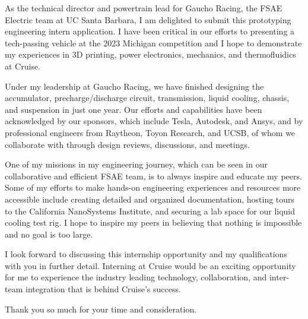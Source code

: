 \documentclass[11pt, letterpaper]{awesome-cv} %
\begin{document}
\makecvheader %

\makelettertitle %


\begin{cvletter}

As the technical director and powertrain lead for Gaucho Racing, the FSAE Electric team at UC Santa Barbara, I am delighted to submit this prototyping engineering intern application. I have been critical in our efforts to presenting a tech-passing vehicle at the 2023 Michigan competition and I hope to demonstrate my experiences in 3D printing, power electronics, mechanics, and thermofluidics at Cruise. 

Under my leadership at Gaucho Racing, we have finished designing the accumulator, precharge/discharge circuit, transmission, liquid cooling, chassis, and suspension in just one year. Our efforts and capabilities have been acknowledged by our sponsors, which include Tesla, Autodesk, and Ansys, and by professional engineers from Raytheon, Toyon Research, and UCSB, of whom we collaborate with through design reviews, discussions, and meetings. 

One of my missions in my engineering journey, which can be seen in our collaborative and efficient FSAE team, is to always inspire and educate my peers. Some of my efforts to make hands-on engineering experiences and resources more accessible include creating detailed and organized documentation, hosting tours to the California NanoSystems Institute, and securing a lab space for our liquid cooling test rig. I hope to inspire my peers in believing that nothing is impossible and no goal is too large.

I look forward to discussing this internship opportunity and my qualifications with you in further detail. Interning at Cruise would be an exciting opportunity for me to experience the industry leading technology, collaboration, and inter-team integration that is behind Cruise's success. 

Thank you so much for your time and consideration.



\end{cvletter}


\makeletterclosing %
\end{document}
